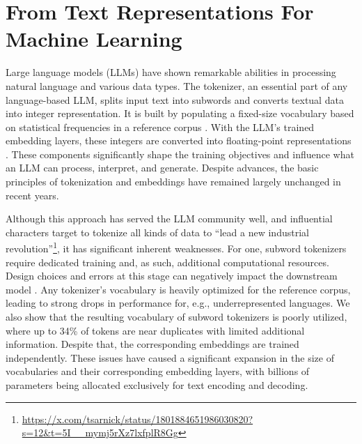 \documentclass[11pt]{article}
\begin{document}
\section{From Text Representations For Machine Learning}
\label{sec:intro}

Large language models (LLMs) have shown remarkable abilities in processing natural language and various data types. The tokenizer, an essential part of any language-based LLM, splits input text into subwords and converts textual data into integer representation.
It is built by populating a fixed-size vocabulary based on statistical frequencies in a reference corpus \cite{sennrich2016bpe, kudo2018sentencepiece}.
With the LLM's trained embedding layers, these integers are converted into floating-point representations \cite{mikolov2013distributed, press2017using, vaswani2017attention}. These components significantly shape the training objectives and influence  what an LLM can process, interpret, and generate. Despite advances, the basic principles of tokenization and embeddings have remained largely unchanged in recent years.

{\let\thefootnote\relax{}}

Although this approach has served the LLM community well, 
and influential characters target to tokenize all kinds of data to ``lead a new industrial revolution''\footnote{\tiny{\url{https://x.com/tsarnick/status/1801884651986030820?s=12&t=5I__mymj5rXz7lxfplR8Gg}}},
it has significant inherent weaknesses. For one, subword tokenizers require dedicated training and, as such, additional computational resources. Design choices and errors at this stage can negatively impact the downstream model \cite{ali2024tokenizer}. 
Any tokenizer's vocabulary is heavily optimized for the reference corpus, leading to strong drops in performance for, e.g., underrepresented languages. 
We also show that the resulting vocabulary of subword tokenizers is poorly utilized, where up to 34\% of tokens are near duplicates with limited additional information. Despite that, the corresponding embeddings are trained independently. 
These issues have caused a significant expansion in the size of vocabularies and their corresponding embedding layers, with billions of parameters being allocated exclusively for text encoding and decoding.
\end{document}
